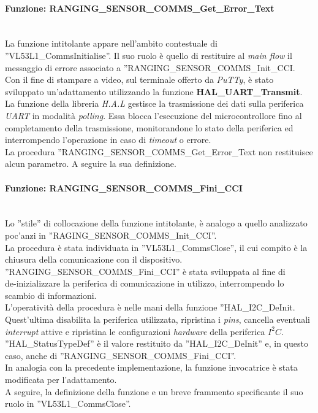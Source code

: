 \paragraph{Funzione: RANGING\_SENSOR\_COMMS\_Get\_Error\_Text}\mbox{}\\
La funzione intitolante appare nell'ambito contestuale di ''VL53L1\_CommsInitialise''. Il suo ruolo è quello di restituire al \textit{main flow} il messaggio di errore associato a ''RANGING\_SENSOR\_COMMS\_Init\_CCI.\\
Con il fine di stampare a video, sul terminale offerto da \textit{PuTTy}, è stato sviluppato un'adattamento utilizzando la funzione \textbf{HAL\_UART\_Transmit}. La funzione della libreria \textit{H.A.L} gestisce 
la trasmissione dei dati sulla periferica \textit{UART} in modalità \textit{polling}. Essa blocca l'esecuzione del microcontrollore fino al completamento della trasmissione, monitorandone lo stato della periferica ed interrompendo l'operazione in caso di \textit{timeout} o errore.\\
La procedura ''RANGING\_SENSOR\_COMMS\_Get\_Error\_Text non restituisce alcun parametro. A seguire la sua definizione.\\



\paragraph{Funzione: RANGING\_SENSOR\_COMMS\_Fini\_CCI}\mbox{}\\
Lo ''stile'' di collocazione della funzione intitolante, è analogo a quello analizzato poc'anzi in ''RAGING\_SENSOR\_COMMS\_Init\_CCI''.\\
La procedura è stata individuata in ''VL53L1\_CommsClose'', il cui compito è la chiusura della comunicazione con il dispositivo.\\
''RANGING\_SENSOR\_COMMS\_Fini\_CCI'' è stata sviluppata al fine di \\
de-inizializzare la periferica di comunicazione in utilizzo, interrompendo lo scambio di informazioni.\\
L'operatività della procedura è nelle mani della funzione ''HAL\_I2C\_DeInit. Quest'ultima disabilita la periferica utilizzata, ripristina i \textit{pins}, cancella eventuali \textit{interrupt} attive e ripristina le configurazioni
\textit{hardware} della periferica \textit{$I^2C$}.\\
''HAL\_StatusTypeDef'' è il valore restituito da ''HAL\_I2C\_DeInit'' e, in questo caso, anche di ''RANGING\_SENSOR\_COMMS\_Fini\_CCI''.\\
In analogia con la precedente implementazione, la funzione invocatrice è stata modificata per l'adattamento.\\
A seguire, la definizione della funzione e un breve frammento specificante il suo ruolo in ''VL53L1\_CommsClose''.\\

